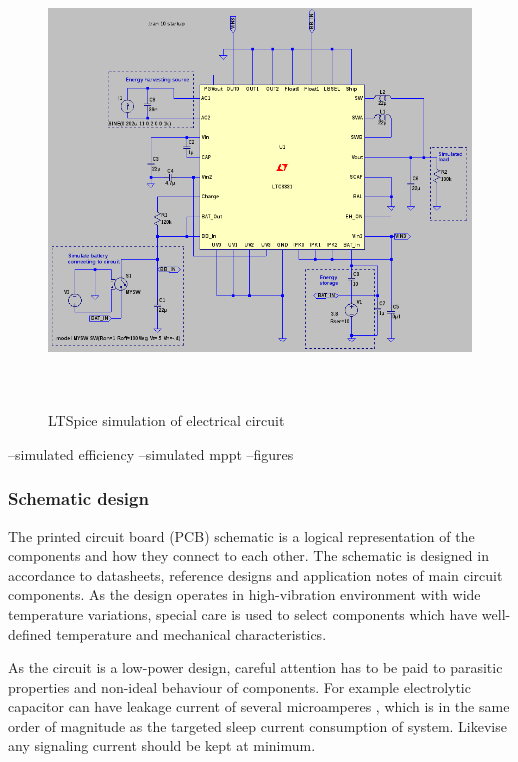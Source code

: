 \begin{figure}[htb]
\begin{center}
\includegraphics[height=12cm]{images/own_dwg/ltspice_ltc3331.jpg}
\end{center}
\caption{\label{fig:ltspice_sim} LTSpice \cite{ltspice} simulation of electrical circuit}
\end{figure}

--simulated efficiency
--simulated mppt
--figures

\subsubsection{Schematic design}
The printed circuit board (PCB) schematic is a logical representation of the components and how they connect to each other. The schematic is designed in accordance to datasheets, reference designs and application notes of main circuit components. As the design operates in high-vibration environment with wide temperature variations, special care is used to select components which have well-defined temperature and mechanical characteristics. 

As the circuit is a low-power design, careful attention has to be paid to parasitic properties and non-ideal behaviour of components. For example electrolytic capacitor can have leakage current of several microamperes \cite{Both2001}, which is in the same order of magnitude as the targeted sleep current consumption of system. Likevise any signaling current should be kept at minimum. 

